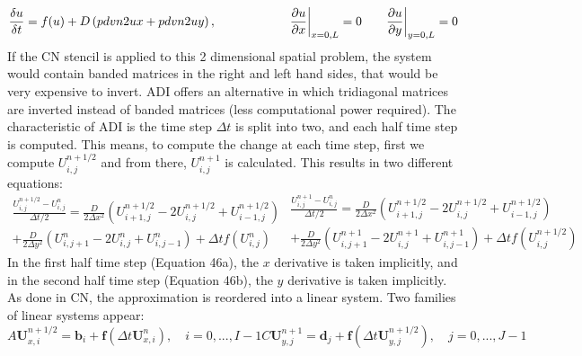 \begin{equation}
    \frac{\delta u}{\delta t} =  f(u) + D\left(\\pdvn{2}{u}{x} + \\pdvn{2}{u}{y}\right) ,   \quad \quad \quad \quad \quad \quad \pdv{u}{x}\biggr\rvert_{x=0,L}=0 \quad \quad \pdv{u}{y}\biggr\rvert_{y=0,L}=0
\end{equation}
If the CN stencil is applied to this 2 dimensional spatial problem, the system would contain banded matrices in the right and left hand sides, that would be very expensive to invert. \acrshort{ADI} offers an alternative in which tridiagonal matrices are inverted instead of banded matrices (less computational power required). The characteristic of \acrshort{ADI} is the time step $\Delta t$ is split into two, and each half time step is computed. This means, to compute the change at each time step, first we compute $U^{n+1/2}_{i,j} $ and from there,    $U^{n+1}_{i,j} $ is calculated. This results in two different equations:
\begin{subequations}
    \begin{equation}
        \begin{split}
            \frac{U^{n+1/2}_{i,j} - U^{n}_{i,j} }{\Delta t/2} = \frac{D}{2\Delta x^{2}}\left( U^{n+1/2}_{i+1,j} -  2U^{n+1/2}_{i,j} + U^{n+1/2}_{i-1,j}\right)  \\+ \frac{D}{2\Delta y^{2}}\left( U^{n}_{i,j+1} -  2U^{n}_{i,j} + U^{n}_{i,j-1}\right)  + \Delta t f(U^{n}_{i,j})
        \end{split}
    \end{equation}
    \begin{equation}
        \begin{split}
            \frac{U^{n+1}_{i,j} - U^{n}_{i,j} }{\Delta t/2} = \frac{D}{2\Delta x^{2}}\left( U^{n+1/2}_{i+1,j} -  2U^{n+1/2}_{i,j} + U^{n+1/2}_{i-1,j}\right)  \\+ \frac{D}{2\Delta y^{2}}\left( U^{n+1}_{i,j+1} -  2U^{n+1}_{i,j} + U^{n+1}_{i,j-1}\right)  + \Delta t f(U^{n+1/2}_{i,j})
        \end{split}
    \end{equation}
\end{subequations}
In the first half time step (Equation 46a), the $x$ derivative is taken implicitly, and in the second half time step (Equation 46b), the $y$ derivative is taken implicitly. As done in \acrshort{CN}, the approximation is reordered into a linear system. Two families of linear systems appear:
\begin{subequations}
    \begin{equation}
        A\textbf{U}^{n+1/2}_{x,i} = \textbf{b}_{i} + \textbf{f}(\Delta t \textbf{U}^{n}_{x,i}), \quad i=0,...,I-1
    \end{equation}
    \begin{equation}
        C\textbf{U}^{n+1}_{y,j} = \textbf{d}_{j} + \textbf{f}(\Delta t \textbf{U}^{n+1/2}_{y,j}), \quad j=0,...,J-1
    \end{equation}
\end{subequations}
